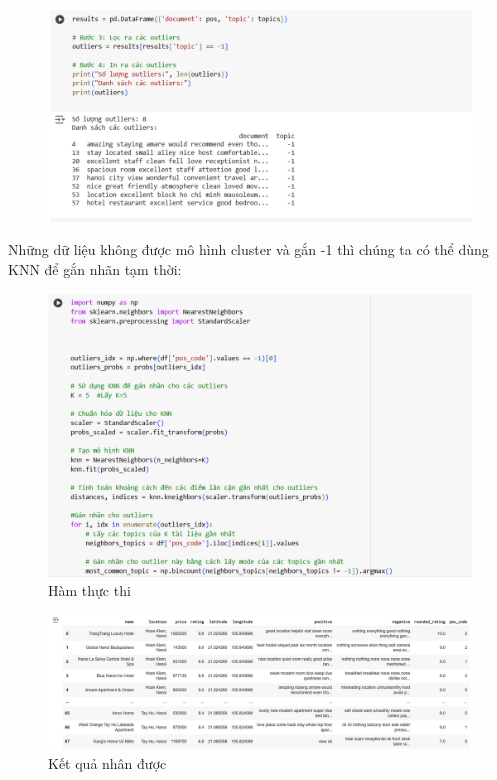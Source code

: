 \begin{enumerate}
     \begin{figure}[H]
        \centering
        \includegraphics[width=1\linewidth]{Figures/8.20.png}
        \label{fig:enter-label}
    \end{figure}

    Những dữ liệu không được mô hình cluster và gắn -1 thì chúng ta có thể dùng KNN để gắn nhãn tạm thời:

    \begin{figure}[H]
        \centering
        \includegraphics[width=1\linewidth]{Figures/8.21.png}
        \caption{Hàm thực thi}
        \label{fig:enter-label}
    \end{figure}

    \begin{figure}[H]
        \centering
        \includegraphics[width=1\linewidth]{Figures/8.22.png}
        \caption{Kết quả nhân được}
        \label{fig:enter-label}
    \end{figure}
    
    
\end{enumerate}

